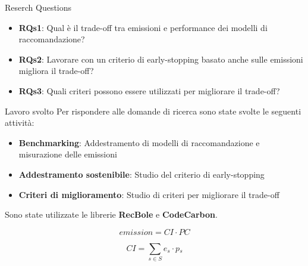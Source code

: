 \begin{frame}{Reserch Questions}
    \begin{itemize}
        \item \textbf{RQs1}: Qual è il trade-off tra emissioni e performance dei modelli di raccomandazione?
        \item \textbf{RQs2}: Lavorare con un criterio di early-stopping basato anche sulle emissioni migliora il trade-off?
        \item \textbf{RQs3}: Quali criteri possono essere utilizzati per migliorare il trade-off?
    \end{itemize}
\end{frame}

\begin{frame}{Lavoro svolto}
    Per rispondere alle domande di ricerca sono state svolte le seguenti attività:
    \begin{itemize}
        \item \textbf{Benchmarking}: Addestramento di modelli di raccomandazione e misurazione delle emissioni
        \item \textbf{Addestramento sostenibile}: Studio del criterio di early-stopping
        \item \textbf{Criteri di miglioramento}: Studio di criteri per migliorare il trade-off
    \end{itemize}
    Sono state utilizzate le librerie \textbf{RecBole} e \textbf{CodeCarbon}.

    \begin{equation*}
        \textit{emission} = \textit{CI}  \cdot \textit{PC}
    \end{equation*}
    
    \begin{equation*}
        \textit{CI} = \sum_{s \in S} \textit{e$_s$} \cdot \textit{p$_s$}
    \end{equation*}
    
\end{frame}